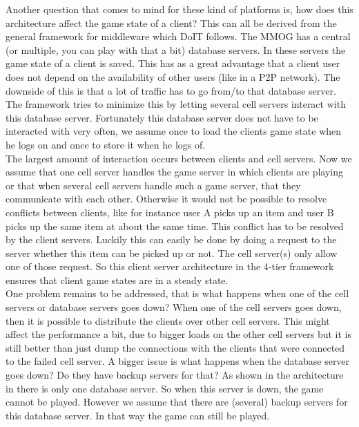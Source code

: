 Another question that comes to mind for these kind of platforms is, how does this architecture affect the game state of a client? 
This can all be derived from the general framework for middleware which DoIT follows.
The MMOG has a central (or multiple, you can play with that a bit) database servers.
In these servers the game state of a client is saved. 
This has as a great advantage that a client user does not depend on the availability of other users (like in a P2P network). 
The downside of this is that a lot of traffic has to go from/to that database server.
The framework tries to minimize this by letting several cell servers interact with this database server.
Fortunately this database server does not have to be interacted with very often, we assume once to load the clients game state when he logs on and once to store it when he logs of. \\
The largest amount of interaction occurs between clients and cell servers. 
Now we assume that one cell server handles the game server in which clients are playing or that when several cell servers handle such a game server, that they communicate with each other. 
Otherwise it would not be possible to resolve conflicts between clients, like for instance user A picks up an item and user B picks up the same item at about the same time. 
This conflict has to be resolved by the client servers. 
Luckily this can easily be done by doing a request to the server whether this item can be picked up or not. 
The cell server(s) only allow one of those request. So this client server architecture in the 4-tier framework ensures that client game states are in a steady state.\\

One problem remains to be addressed, that is what happens when one of the cell servers or database servers goes down?
When one of the cell servers goes down, then it is possible to distribute the clients over other cell servers. 
This might affect the performance a bit, due to bigger loads on the other cell servers but it is still better than just dump the connections with the clients that were connected to the failed cell server. 
A bigger issue is what happens when the database server goes down? 
Do they have backup servers for that? 
As shown in the architecture in \cite{midfig} there is only one database server. 
So when this server is down, the game cannot be played. 
However we assume that there are (several) backup servers for this database server. 
In that way the game can still be played.\\

